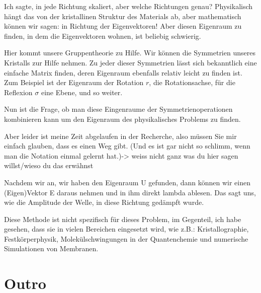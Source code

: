 \documentclass[a4paper]{article}
\newcommand{\scene}[1]{\par\noindent[ #1 ]\par}
\begin{document}
Ich sagte, in jede Richtung skaliert, aber welche Richtungen genau?
Physikalisch hängt das von der kristallinen Struktur des Materials ab, aber
mathematisch können wir sagen: in Richtung der Eigenvektoren!  Aber diesen
Eigenraum zu finden, in dem die Eigenvektoren wohnen, ist beliebig schwierig. 

Hier kommt unsere Gruppentheorie zu Hilfe. Wir können die Symmetrien unseres
Kristalls zur Hilfe nehmen. Zu jeder dieser Symmetrien lässt sich bekanntlich eine
einfache Matrix finden, deren Eigenraum ebenfalls relativ leicht zu finden ist.
Zum Beispiel ist der Eigenraum der Rotation \(r\), die Rotationsachse, für die
Reflexion \(\sigma\) eine Ebene, und so weiter.

Nun ist die Frage, ob man diese Eingenraume der Symmetrienoperationen
kombinieren kann um den Eigenraum des physikalisches Problems zu finden.

Aber leider ist meine Zeit abgelaufen in der Recherche, also müssen Sie mir einfach glauben,
dass es einen Weg gibt. (Und es ist gar nicht so schlimm, wenn man die Notation
einmal gelernt hat.)-> weiss nicht ganz was du hier sagen willst/wieso du das erwähnst

Nachdem wir an, wir haben den Eigenraum U gefunden, dann können wir einen (Eigen)Vektor E daraus
nehmen und in ihm direkt lambda ablesen. Das sagt uns, wie die Amplitude der
Welle, in diese Richtung gedämpft wurde.

Diese Methode ist nicht spezifisch für dieses Problem, im Gegenteil, ich habe
gesehen, dass sie in vielen Bereichen eingesetzt wird, wie z.B.:
Kristallographie, Festkörperphysik, Molekülschwingungen in der Quantenchemie
und numerische Simulationen von Membranen.

\section{Outro}
\scene{Camera}
\end{document}
